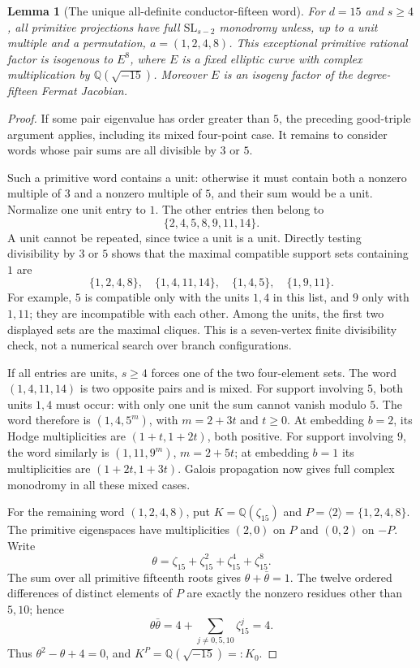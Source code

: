 \documentclass[11pt]{article}
\newtheorem{lemma}[theorem]{Lemma}
\theoremstyle{definition}
\begin{document}
\begin{lemma}[The unique all-definite conductor-fifteen word]
\label{lem:fifteen-exception}
For $d=15$ and $s\ge4$, all primitive projections have full
$\mathrm{SL}_{s-2}$ monodromy unless, up to a unit multiple and a
permutation, $a=(1,2,4,8)$. This exceptional primitive rational factor
is isogenous to $E^8$, where $E$ is a fixed elliptic curve with complex
multiplication by $\mathbb Q(\sqrt{-15})$. Moreover $E$ is an isogeny
factor of the degree-fifteen Fermat Jacobian.
\end{lemma}
\begin{proof}
If some pair eigenvalue has order greater than $5$, the preceding
good-triple argument applies, including its mixed four-point case.
It remains to consider words whose pair sums are all divisible by $3$
or $5$.

Such a primitive word contains a unit: otherwise it must contain both
a nonzero multiple of $3$ and a nonzero multiple of $5$, and their sum
would be a unit. Normalize one unit entry to $1$. The other entries
then belong to
\[
 \{2,4,5,8,9,11,14\}.
\]
A unit cannot be repeated, since twice a unit is a unit. Directly
testing divisibility by $3$ or $5$ shows that the maximal compatible
support sets containing $1$ are
\[
 \{1,2,4,8\},\quad \{1,4,11,14\},\quad
 \{1,4,5\},\quad \{1,9,11\}.
\]
For example, $5$ is compatible only with the units $1,4$ in this list,
and $9$ only with $1,11$; they are incompatible with each other.
Among the units, the first two displayed sets are the maximal cliques.
This is a seven-vertex finite divisibility check, not a numerical
search over branch configurations.

If all entries are units, $s\ge4$ forces one of the two four-element
sets. The word $(1,4,11,14)$ is two opposite pairs and is mixed.
For support involving $5$, both units $1,4$ must occur: with only one
unit the sum cannot vanish modulo $5$. The word therefore is
$(1,4,5^m)$, with $m=2+3t$ and $t\ge0$. At embedding $b=2$, its Hodge
multiplicities are $(1+t,1+2t)$, both positive.
For support involving $9$, the word similarly is $(1,11,9^m)$,
$m=2+5t$; at embedding $b=1$ its multiplicities are
$(1+2t,1+3t)$. Galois propagation now gives full complex monodromy in
all these mixed cases.

For the remaining word $(1,2,4,8)$, put
$K=\mathbb Q(\zeta_{15})$ and $P=\langle2\rangle=\{1,2,4,8\}$.
The primitive eigenspaces have multiplicities $(2,0)$ on $P$ and
$(0,2)$ on $-P$. Write
\[
 \theta=\zeta_{15}+\zeta_{15}^2+\zeta_{15}^4+\zeta_{15}^8.
\]
The sum over all primitive fifteenth roots gives
$\theta+\bar\theta=1$. The twelve ordered differences of distinct
elements of $P$ are exactly the nonzero residues other than $5,10$;
hence
\[
 \theta\bar\theta
 =4+\sum_{j\ne0,5,10}\zeta_{15}^j=4.
\]
Thus $\theta^2-\theta+4=0$, and
$K^P=\mathbb Q(\sqrt{-15})=:K_0$.


\end{proof}
\end{document}
